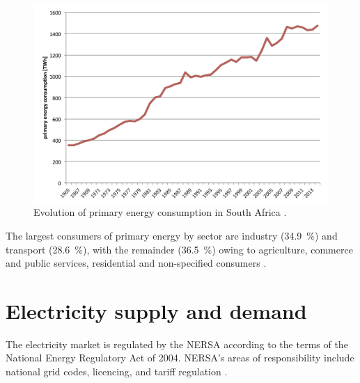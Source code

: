 \begin{figure}[htbp]  
\centering
\includegraphics[width=1\linewidth]{FIG/PrimEnergyDevelopment}
\caption[Evolution of primary energy consumption in South Africa.]{Evolution of primary energy consumption in South Africa \cite{BP2015c}.}\label{PrimEnergyDevelopment}
\end{figure}
The largest consumers of primary energy by sector are industry (\SI{34.9}{\percent}) and transport (\SI{28.6}{\percent}), with the remainder (\SI{36.5}{\percent}) owing to agriculture, commerce and public services, residential and non-specified consumers \cite{DepartmentofEnergy2012}.

\pagebreak
\section{Electricity supply and demand} \label{ElectricitySA}
The electricity market is regulated by the \ac{NERSA} according to the terms of the National Energy Regulatory Act of 2004. \ac{NERSA}'s areas of responsibility include national grid codes, licencing, and tariff regulation \cite{Eskom2015a}.

